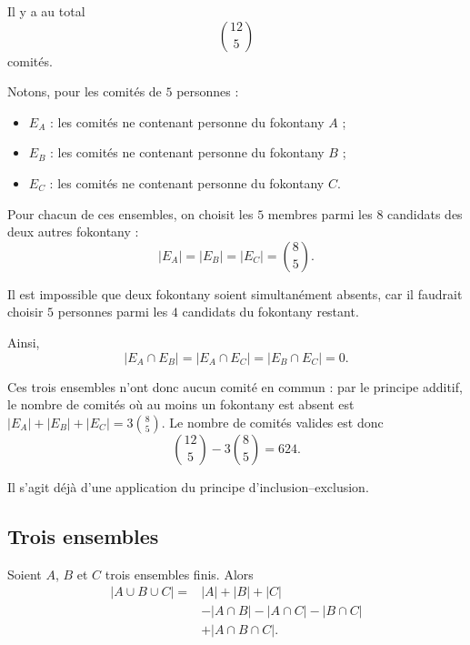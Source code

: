 \documentclass[11pt]{article}
\begin{document}
\begin{solution}
Il y a au total
\[
\binom{12}{5}
\]
comités.

Notons, pour les comités de \(5\) personnes :
\begin{itemize}
    \item \(E_A\) : les comités ne contenant personne du fokontany \(A\) ;
    \item \(E_B\) : les comités ne contenant personne du fokontany \(B\) ;
    \item \(E_C\) : les comités ne contenant personne du fokontany \(C\).
\end{itemize}

Pour chacun de ces ensembles, on choisit les \(5\) membres parmi les \(8\)
candidats des deux autres fokontany :
\[
|E_A|=|E_B|=|E_C|=\binom{8}{5}.
\]

Il est impossible que deux fokontany soient simultanément absents, car il
faudrait choisir \(5\) personnes parmi les \(4\) candidats du fokontany restant.

Ainsi,
\[
|E_A\cap E_B|
=
|E_A\cap E_C|
=
|E_B\cap E_C|
=
0.
\]

Ces trois ensembles n'ont donc aucun comité en commun : par le principe additif, le nombre de
comités où au moins un fokontany est absent est \(|E_A|+|E_B|+|E_C|=3\binom{8}{5}\).
Le nombre de comités valides est donc
\[
\boxed{
\binom{12}{5}
-
3\binom{8}{5}
=
624.
}
\]
\end{solution}

\begin{remarque}
Il s'agit déjà d'une application du principe d'inclusion--exclusion.
\end{remarque}

\subsection{Trois ensembles}\label{sec:trois-ensembles}

\begin{theoreme}\label{thm:ie-trois}
Soient \(A\), \(B\) et \(C\) trois ensembles finis. Alors
\[
\boxed{
\begin{aligned}
|A\cup B\cup C|
={}&|A|+|B|+|C|\\
&-|A\cap B|-|A\cap C|-|B\cap C|\\
&+|A\cap B\cap C|.
\end{aligned}
}
\]
\end{theoreme}
\end{document}
